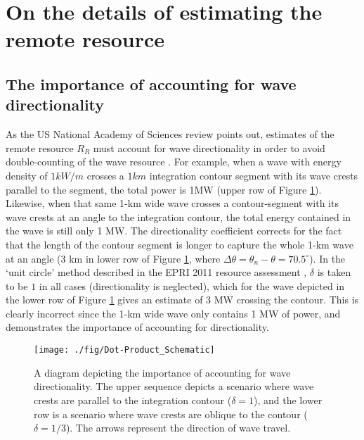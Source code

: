 \section{On the details of estimating the remote resource} \label{appendix:one-way-method}

\subsection{The importance of accounting for wave directionality}
\label{appendix:directionality}

As the US National Academy of Sciences review points out, estimates of the remote resource $R_R$ must account for wave directionality in order to avoid double-counting of the wave resource \citep{nationalresearchcouncilEvaluationDepartmentEnergy2013}. For example, when a wave with energy density of $1 \unit{kW/m}$ crosses a $1 \unit{km}$ integration contour segment with its wave crests parallel to the segment, the total power is 1MW (upper row of Figure \ref{fig:directionality}). Likewise, when that same 1-km wide wave crosses a contour-segment with its wave crests at an angle to the integration contour, the total energy contained in the wave is still only 1 MW. The directionality coefficient corrects for the fact that the length of the contour segment is longer to capture the whole 1-km wave at an angle (3 km in lower row of Figure \ref{fig:directionality}, where $\Delta\theta = \theta_n - \theta = 70.5^{\circ}$). In the `unit circle' method described in the EPRI 2011 resource assessment \citep{EPRIwaveresource2011}, $\delta$ is taken to be $1$ in all cases (directionality is neglected), which for the wave depicted in the lower row of Figure \ref{fig:directionality} gives an estimate of 3 MW crossing the contour. This is clearly incorrect since the 1-km wide wave only contains 1 MW of power, and demonstrates the importance of accounting for directionality.

\begin{figure}[ht]
    \centering
    \texttt{[image: ./fig/Dot-Product\_Schematic]}
    \caption{A diagram depicting the importance of accounting for wave directionality. The upper sequence depicts a scenario where wave crests are parallel to the integration contour ($\delta = 1$), and the lower row is a scenario where wave crests are oblique to the contour ($\delta = 1/3$). The arrows represent the direction of wave travel.}
    \label{fig:directionality}
\end{figure}

